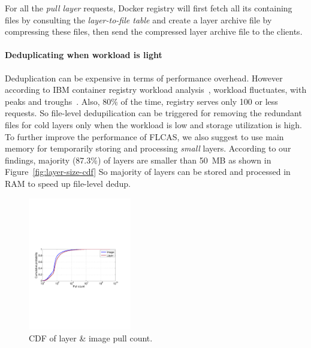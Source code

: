 For all the \emph{pull layer} requests, Docker registry will first fetch 
all its containing files by consulting the \textit{layer-to-file table} and 
create a layer archive file by compressing these files, 
then send the compressed layer archive file to the clients.

\paragraph{Deduplicating when workload is light}
Deduplication can be expensive in terms of performance overhead. However
according to IBM container registry workload analysis~\cite{dockerworkload},
workload fluctuates, with peaks and troughs~\cite{dockerworkload}. Also, 80\%
of the time, registry serves only 100 or less requests. So file-level
dedupilication can be triggered for removing the redundant files for cold
layers only when the workload is low and storage utilization is high.  To
further improve the performance of FLCAS, we also suggest to use main memory
for temporarily storing and processing \textit{small} layers. According to our
findings, majority (87.3\%) of layers are smaller than 50~MB as shown in
Figure~\ref{fig:layer-size-cdf} So majority of layers can be stored and
processed in RAM to speed up file-level dedup. 

\begin{figure}
	\centering
	\includegraphics[width=0.4\textwidth]{graphs/pull-cnt.pdf}
	\caption{CDF of layer \& image pull count.
	}
	\label{fig:pull-cnt}
\end{figure}

